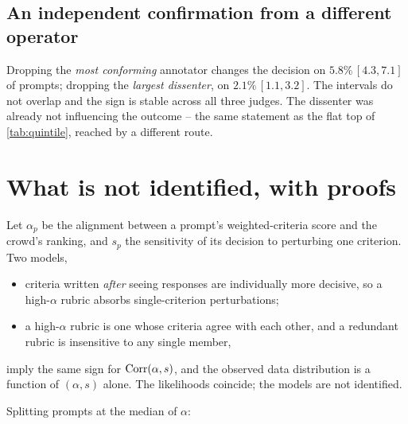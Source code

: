 
\subsection{An independent confirmation from a different operator}

Dropping the \emph{most conforming} annotator changes the decision on
$5.8\%\,[4.3,7.1]$ of prompts; dropping the \emph{largest dissenter}, on
$2.1\%\,[1.1,3.2]$. The intervals do not overlap and the sign is stable across
all three judges. The dissenter was already not influencing the outcome -- the
same statement as the flat top of \cref{tab:quintile}, reached by a different
route.

\section{What is not identified, with proofs}
\label{sec:notid}

\begin{proposition}
\label{prop:contam}
Let $\alpha_p$ be the alignment between a prompt's weighted-criteria score and
the crowd's ranking, and $s_p$ the sensitivity of its decision to perturbing one
criterion. Two models,
\begin{itemize}
\item[$C$:] criteria written \emph{after} seeing responses are individually more
      decisive, so a high-$\alpha$ rubric absorbs single-criterion perturbations;
\item[$R$:] a high-$\alpha$ rubric is one whose criteria agree with each other,
      and a redundant rubric is insensitive to any single member,
\end{itemize}
imply the same sign for $\operatorname{Corr}(\alpha,s)$, and the observed data distribution is
a function of $(\alpha,s)$ alone. The likelihoods coincide; the models are not
identified.
\end{proposition}

 Splitting prompts at the median of $\alpha$:

